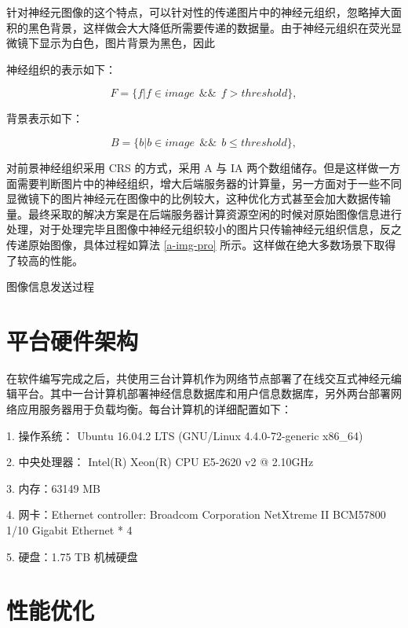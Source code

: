 针对神经元图像的这个特点，可以针对性的传递图片中的神经元组织，忽略掉大面积的黑色背景，这样做会大大降低所需要传递的数据量。由于神经元组织在荧光显微镜下显示为白色，图片背景为黑色，因此

神经组织的表示如下：

$$F = \{f | f \in image ~~ \&\& ~~ f > threshold\},$$

背景表示如下：

$$B = \{b | b \in image ~~ \&\& ~~ b \leq threshold\},$$

对前景神经组织采用 CRS 的方式，采用 A 与 IA 两个数组储存。但是这样做一方面需要判断图片中的神经组织，增大后端服务器的计算量，另一方面对于一些不同显微镜下的图片神经元在图像中的比例较大，这种优化方式甚至会加大数据传输量。最终采取的解决方案是在后端服务器计算资源空闲的时候对原始图像信息进行处理，对于处理完毕且图像中神经元组织较小的图片只传输神经元组织信息，反之传递原始图像，具体过程如算法 \ref{a-img-pro} 所示。这样做在绝大多数场景下取得了较高的性能。

\begin{algorithm}
  \caption{图像信息发送过程}
  \begin{algorithmic}[1]
    \ELSE
      \ENDIF
    \ENDIF
  \end{algorithmic}
  \label{a-img-pro}
\end{algorithm}

\section{平台硬件架构}
在软件编写完成之后，共使用三台计算机作为网络节点部署了在线交互式神经元编辑平台。其中一台计算机部署神经信息数据库和用户信息数据库，另外两台部署网络应用服务器用于负载均衡。每台计算机的详细配置如下：

1. 操作系统： Ubuntu 16.04.2 LTS (GNU/Linux 4.4.0-72-generic x86\_64)

2. 中央处理器： Intel(R) Xeon(R) CPU E5-2620 v2 @ 2.10GHz

3. 内存：63149 MB

4. 网卡：Ethernet controller: Broadcom Corporation NetXtreme II BCM57800 1/10 Gigabit Ethernet * 4

5. 硬盘：1.75 TB 机械硬盘

\section{性能优化}

